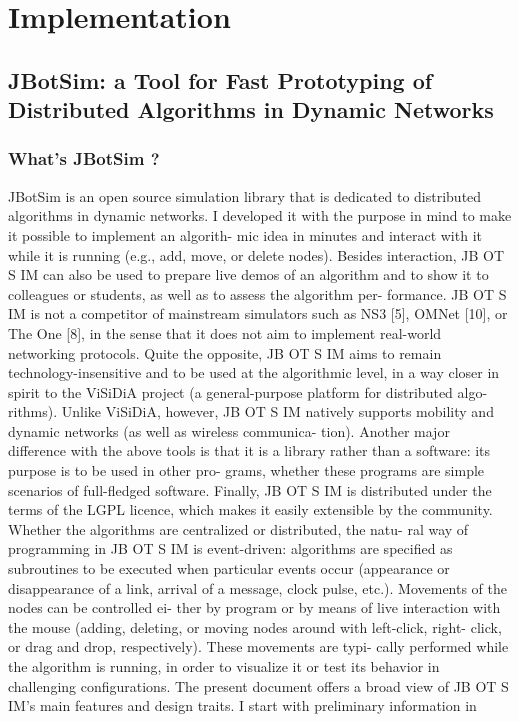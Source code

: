 \chapter{Implementation}
\section{JBotSim: a Tool for Fast Prototyping of Distributed Algorithms in Dynamic Networks}
\subsection{What's JBotSim ?}
JBotSim is an open source simulation library that is dedicated to distributed algorithms in dynamic networks. I developed it with the purpose in mind to make it possible to implement an algorith- mic idea in minutes and interact with it while it is running (e.g., add, move, or delete nodes). Besides interaction, JB OT S IM can also be used to prepare live demos of an algorithm and to show it to colleagues or students, as well as to assess the algorithm per- formance. JB OT S IM is not a competitor of mainstream simulators such as NS3 [5], OMNet [10], or The One [8], in the sense that it does not aim to implement real-world networking protocols. Quite the opposite, JB OT S IM aims to remain technology-insensitive and to be used at the algorithmic level, in a way closer in spirit to the ViSiDiA project (a general-purpose platform for distributed algo- rithms). Unlike ViSiDiA, however, JB OT S IM natively supports mobility and dynamic networks (as well as wireless communica- tion). Another major difference with the above tools is that it is a library rather than a software: its purpose is to be used in other pro- grams, whether these programs are simple scenarios of full-fledged software. Finally, JB OT S IM is distributed under the terms of the LGPL licence, which makes it easily extensible by the community. Whether the algorithms are centralized or distributed, the natu- ral way of programming in JB OT S IM is event-driven: algorithms are specified as subroutines to be executed when particular events occur (appearance or disappearance of a link, arrival of a message, clock pulse, etc.). Movements of the nodes can be controlled ei- ther by program or by means of live interaction with the mouse (adding, deleting, or moving nodes around with left-click, right- click, or drag and drop, respectively). These movements are typi- cally performed while the algorithm is running, in order to visualize it or test its behavior in challenging configurations. The present document offers a broad view of JB OT S IM’s main features and design traits. I start with preliminary information in
